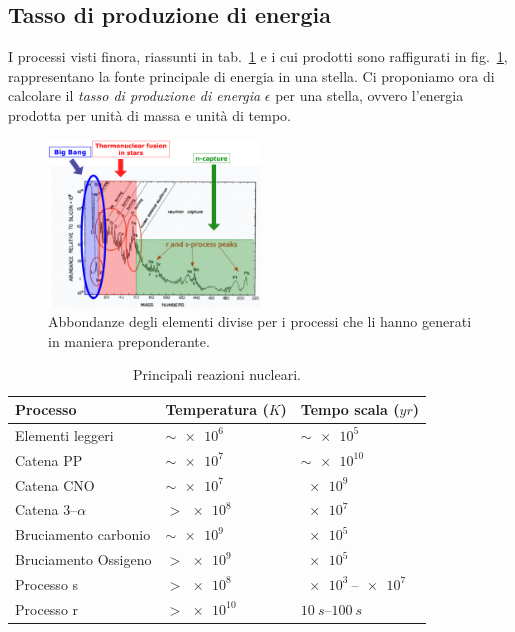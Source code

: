 \subsection{Tasso di produzione di energia}
I processi visti finora, riassunti in tab.~\ref{tab:processi-produzione-energia} e i cui prodotti sono raffigurati in fig.~\ref{fig:processi-produzione-energia}, rappresentano la fonte principale di energia in una stella. Ci proponiamo ora di calcolare il \emph{tasso di produzione di energia} $\epsilon$ per una stella, ovvero l'energia prodotta per unità di massa e unità di tempo. 

\begin{figure}
    \centering
    \includegraphics[width=0.5\textwidth]{immagini/processi-produzione-energia.png}
    \caption{Abbondanze degli elementi divise per i processi che li hanno generati in maniera preponderante.}
    \label{fig:processi-produzione-energia}
\end{figure}

\begin{table}
\caption{Principali reazioni nucleari.}
\label{tab:processi-produzione-energia}
\centering
\begin{tabular}{lll}
\toprule
Processo & Temperatura ($\si{K}$) & Tempo scala  ($\si{yr}$)\\
\midrule
Elementi leggeri & $\sim \SI{e6}{}$ & $\sim \SI{e5}{}$ \\
Catena PP & $\sim \SI{e7}{}$ & $\sim \SI{e10}{}$ \\
Catena CNO & $\sim \SI{e7}{}$ & $ \SI{e9}{}$\\
Catena 3--$\alpha$ & $> \SI{e8}{}$ & $\SI{e7}{}$ \\
Bruciamento carbonio & $\sim \SI{e9}{}$ & $\SI{e5}{}$ \\
Bruciamento Ossigeno & $> \SI{e9}{}$ & $\SI{e5}{}$ \\
Processo s & $> \SI{e8}{}$ & $\SI{e3}{}$--$\SI{e7}{}$ \\
Processo r & $> \SI{e10}{}$ & $\SI{10}{s}$--$\SI{100}{s}$ \\
\bottomrule
\end{tabular}
\end{table}

